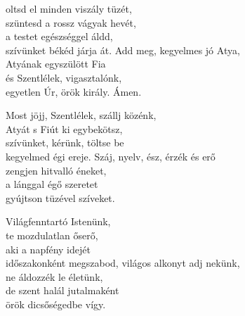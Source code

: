 \documentclass[twoside]{article}
\begin{document}

\begin{hymnstanzas}
    oltsd el minden viszály tüzét,\\
    szüntesd a rossz vágyak hevét,\\
    a testet egészséggel áldd,\\
    szívünket békéd járja át.
\stanzabreak
    Add meg, kegyelmes jó Atya,\\
    Atyának egyszülött Fia\\
    és Szentlélek, vigasztalónk,\\
    egyetlen Úr, örök király. Ámen.
\end{hymnstanzas}


\begin{hymnstanzas}
    Most jöjj, Szentlélek, szállj közénk,\\
    Atyát s Fiút ki egybekötsz,\\
    szívünket, kérünk, töltse be\\
    kegyelmed égi ereje.
\stanzabreak
    Száj, nyelv, ész, érzék és erő\\
    zengjen hitvalló éneket,\\
    a lánggal égő szeretet\\
    gyújtson tüzével szíveket.
\end{hymnstanzas}


\begin{hymnstanzas}
    Világfenntartó Istenünk,\\
    te mozdulatlan őserő,\\
    aki a napfény idejét\\
    időszakonként megszabod,
\stanzabreak
    világos alkonyt adj nekünk,\\
    ne áldozzék le életünk,\\
    de szent halál jutalmaként\\
    örök dicsőségedbe vígy.
\end{hymnstanzas}

\end{document}
